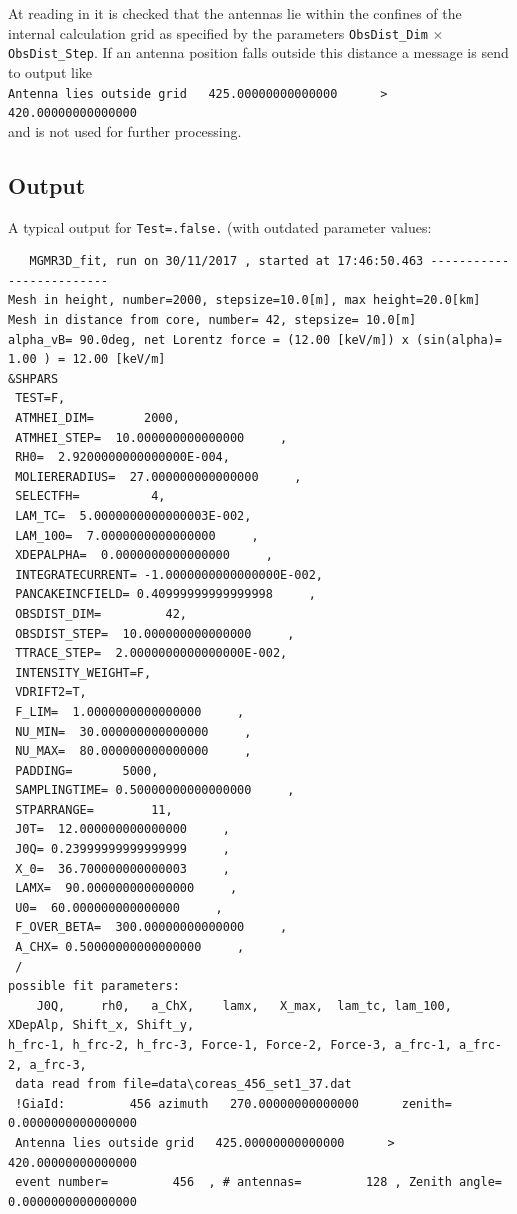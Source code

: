 \documentclass[pdftex,dvipsnames,usenames,fleqn,12pt]{article}
\begin{document}
At reading in it is checked that the antennas lie within the confines of the internal calculation grid as specified by the parameters \verb<ObsDist_Dim< $\times$ \verb<ObsDist_Step<. If an antenna position falls outside this distance a message is send to output like
\\\verb<Antenna lies outside grid   425.00000000000000      >   420.00000000000000 <
\\and is not used for further processing.

\subsection{Output}

A typical output for \verb<Test=.false.< (with outdated parameter values:

{\scriptsize  %
\begin{linenumbers}\resetlinenumber
\noindent\begin{verbatim}
   MGMR3D_fit, run on 30/11/2017 , started at 17:46:50.463 -------------------------
Mesh in height, number=2000, stepsize=10.0[m], max height=20.0[km]
Mesh in distance from core, number= 42, stepsize= 10.0[m]
alpha_vB= 90.0deg, net Lorentz force = (12.00 [keV/m]) x (sin(alpha)=  1.00 ) = 12.00 [keV/m]
&SHPARS
 TEST=F,
 ATMHEI_DIM=       2000,
 ATMHEI_STEP=  10.000000000000000     ,
 RH0=  2.9200000000000000E-004,
 MOLIERERADIUS=  27.000000000000000     ,
 SELECTFH=          4,
 LAM_TC=  5.0000000000000003E-002,
 LAM_100=  7.0000000000000000     ,
 XDEPALPHA=  0.0000000000000000     ,
 INTEGRATECURRENT= -1.0000000000000000E-002,
 PANCAKEINCFIELD= 0.40999999999999998     ,
 OBSDIST_DIM=         42,
 OBSDIST_STEP=  10.000000000000000     ,
 TTRACE_STEP=  2.0000000000000000E-002,
 INTENSITY_WEIGHT=F,
 VDRIFT2=T,
 F_LIM=  1.0000000000000000     ,
 NU_MIN=  30.000000000000000     ,
 NU_MAX=  80.000000000000000     ,
 PADDING=       5000,
 SAMPLINGTIME= 0.50000000000000000     ,
 STPARRANGE=        11,
 J0T=  12.000000000000000     ,
 J0Q= 0.23999999999999999     ,
 X_0=  36.700000000000003     ,
 LAMX=  90.000000000000000     ,
 U0=  60.000000000000000     ,
 F_OVER_BETA=  300.00000000000000     ,
 A_CHX= 0.50000000000000000     ,
 /
possible fit parameters:
    J0Q,     rh0,   a_ChX,    lamx,   X_max,  lam_tc, lam_100, XDepAlp, Shift_x, Shift_y,
h_frc-1, h_frc-2, h_frc-3, Force-1, Force-2, Force-3, a_frc-1, a_frc-2, a_frc-3,
 data read from file=data\coreas_456_set1_37.dat
 !GiaId:         456 azimuth   270.00000000000000      zenith=   0.0000000000000000
 Antenna lies outside grid   425.00000000000000      >   420.00000000000000
 event number=         456  , # antennas=         128 , Zenith angle=   0.0000000000000000


\end{verbatim}
\end{linenumbers}}
\end{document}
